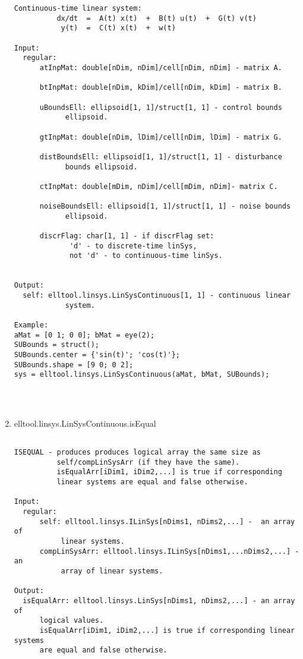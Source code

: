 \begin{enumerate}
\begin{lstlisting}
Continuous-time linear system:
          dx/dt  =  A(t) x(t)  +  B(t) u(t)  +  G(t) v(t)
           y(t)  =  C(t) x(t)  +  w(t)

Input:
  regular:
      atInpMat: double[nDim, nDim]/cell[nDim, nDim] - matrix A.

      btInpMat: double[nDim, kDim]/cell[nDim, kDim] - matrix B.

      uBoundsEll: ellipsoid[1, 1]/struct[1, 1] - control bounds
            ellipsoid.

      gtInpMat: double[nDim, lDim]/cell[nDim, lDim] - matrix G.

      distBoundsEll: ellipsoid[1, 1]/struct[1, 1] - disturbance
            bounds ellipsoid.

      ctInpMat: double[mDim, nDim]/cell[mDim, nDim]- matrix C.

      noiseBoundsEll: ellipsoid[1, 1]/struct[1, 1] - noise bounds
            ellipsoid.

      discrFlag: char[1, 1] - if discrFlag set:
             'd' - to discrete-time linSys,
             not 'd' - to continuous-time linSys.


Output:
  self: elltool.linsys.LinSysContinuous[1, 1] - continuous linear
            system.

Example:
aMat = [0 1; 0 0]; bMat = eye(2);
SUBounds = struct();
SUBounds.center = {'sin(t)'; 'cos(t)'};
SUBounds.shape = [9 0; 0 2];
sys = elltool.linsys.LinSysContinuous(aMat, bMat, SUBounds);




\end{lstlisting}
\fontfamily{\familydefault}
\selectfont
\item {elltool.linsys.LinSysContinuous.isEqual}
\selectfont
\begin{lstlisting}

ISEQUAL - produces produces logical array the same size as
          self/compLinSysArr (if they have the same).
          isEqualArr[iDim1, iDim2,...] is true if corresponding
          linear systems are equal and false otherwise.

Input:
  regular:
      self: elltool.linsys.ILinSys[nDims1, nDims2,...] -  an array of
           linear systems.
      compLinSysArr: elltool.linsys.ILinSys[nDims1,...nDims2,...] - an
           array of linear systems.

Output:
  isEqualArr: elltool.linsys.LinSys[nDims1, nDims2,...] - an array of
      logical values.
      isEqualArr[iDim1, iDim2,...] is true if corresponding linear systems
      are equal and false otherwise.


\end{lstlisting}
\end{enumerate}
